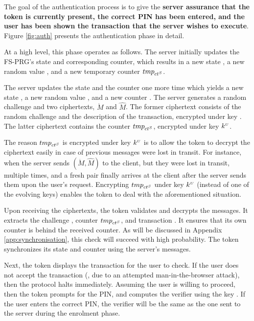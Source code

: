 The goal of the authentication process is to give the \textbf{server assurance that the token is currently present, the correct PIN has been entered, and the user has been shown the transaction that the server wishes to execute}. Figure \ref{fig:auth} presents the authentication phase in detail. 



At a high level, this phase operates as follows. The server initially updates the FS-PRG's state and corresponding counter, which results in a new state \VS{\state}, a new random value  , and a new temporary counter ${tmp}_{{ct}^{\scriptscriptstyle S}}$. 

The server updates the state and the counter one more time which yields a new state \VS{\state}, a new random value , and a new counter \VS{\counter}. The server generates a random challenge and two ciphertexts, $\ddot M$ and $\hat M$. The former ciphertext consists of the random challenge and the description of the transaction, encrypted under key . The latter ciphertext contains the counter ${tmp}_{{ct}^{\scriptscriptstyle S}}$, encrypted under key $k^{\scriptscriptstyle U}$. 

The reason ${tmp}_{{ct}^{\scriptscriptstyle S}}$ is encrypted under key $k^{\scriptscriptstyle U}$ is to allow the token to decrypt the ciphertext easily 
in case of previous messages were lost in transit. For instance, when the server sends $(\ddot M, \hat M)$ to the client, but they were lost in transit, multiple times, and a fresh pair finally arrives at the client after the server sends them upon the user's request. Encrypting ${tmp}_{{ct}^{\scriptscriptstyle S}}$ under key $k^{\scriptscriptstyle U}$ (instead of one of the evolving keys) enables the token to deal with the aforementioned situation. 




Upon receiving the ciphertexts, the token validates and decrypts the messages. It extracts the challenge \VM{\nonce}, counter ${tmp}_{{ct}^{\scriptscriptstyle S}}$, and transaction \VM{\trans}. It ensures that its own counter is behind the received counter. As will be discussed in Appendix \ref{app:synchronisation}, this check will succeed with high probability. The token synchronizes its state and counter using the server's messages. 

Next, the token displays the transaction for the user to check. If the user does not accept the transaction (\eg, due to an attempted man-in-the-browser attack), then the protocol halts immediately. Assuming the user is willing to proceed, then the token prompts for the PIN, and computes the verifier \VC{\verifier} using the key \VC{\salt}. If the user enters the correct PIN, the verifier will be the same as the one sent to the server during the enrolment phase.




